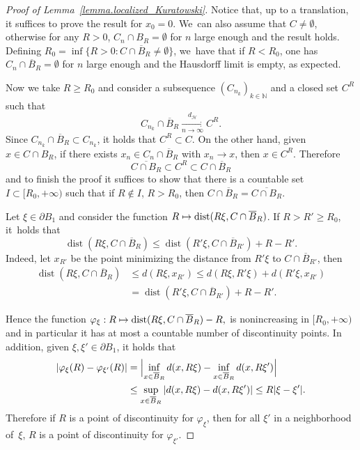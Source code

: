 \documentclass[11pt]{article}
\numberwithin{equation}{section}
\let\ts\textstyle
\newcommand\mto{\mathchoice{\longmapsto}{\mapsto}{\mapsto}{\mapsto}}
\theoremstyle{definition}
\DeclareMathOperator{\dist}{dist}
\newcommand{\distH}{d_{\mathcal{H}}}
\newcommand{\oB}{\overline{B}}
\begin{document}
\begin{proof}[Proof of Lemma~\ref{lemma.localized_Kuratowski}]
Notice that, up to a translation, it suffices to prove the result for $x_0 = 0$. We~can also assume that $C\neq\emptyset$, otherwise
for any $R>0$, $C_n\cap B_R=\emptyset$ for $n$ large enough and the result holds.
Defining $R_0=\inf\{R>0: C\cap \oB_R\neq\emptyset\}$, we~have that if $R<R_0$,
one has $C_n\cap \oB_{R}=\emptyset$ for $n$ large enough
and the Hausdorff limit is empty, as expected.

Now we take $R\ge R_0$ and consider a subsequence $\left(C_{n_k}\right)_{k \in \mathbb{N}}$ and a closed set $C^R$ such that
\[
C_{n_k}\cap \oB_R \xrightarrow[n \to \infty]{\ts\distH} C^R.
\]
Since $C_{n_k}\cap\oB_R\subset C_{n_k}$, it holds that $C^R\subset C$.
On the other hand, given $x\in C \cap B_R$, if there exists $x_n\in C_n \cap \oB_R$
with $x_n\to x$, then $x\in C^R$.
Therefore
\[
\overline{C\cap B_R}\subset C^R\subset C\cap\oB_R
\]
and to finish the proof it suffices to show that there is a countable set $I\subset [R_0,+\infty)$ such that
if $R\not\in I$, $R>R_0$, then $C\cap\oB_R =
\overline{C\cap B_R}$.

Let $\xi\in \partial B_1$ and consider the function
$R\mto \dist(R\xi,C\cap \oB_R)$. If $R>R'\ge R_0$, it~holds that
\[
\dist(R\xi,C\cap \oB_R)
\le \dist(R'\xi,C\cap \oB_{R'})+R-R'.
\]
Indeed, let $x_{R'}$ be the point minimizing the distance from $R'\xi$ to $C\cap \oB_{R'}$, then
\begin{align*}
\dist(R\xi, C\cap \oB_R)
&\le
d(R\xi, x_{R'})
\le
d(R\xi, R'\xi) + d(R'\xi, x_{R'}) \\
&=
\dist(R'\xi, C\cap \oB_{R'}) + R - R'.
\end{align*}

Hence the function
$
\varphi_\xi : R \mto \dist(R\xi,C\cap \oB_R)-R,
$
is nonincreasing in $[R_0,+\infty)$ and in particular it has at
most a countable number of discontinuity points. In addition, given $\xi,\xi'\in\partial B_1$, it holds that
\begin{align*}
\left|
\varphi_\xi(R) - \varphi_{\xi'}(R)
\right|
&=
\Bigl|
\inf_{x \in \oB_R} d(x, R\xi) - \inf_{x \in \oB_R} d(x, R\xi')
\Bigr|\\
&\le
\sup_{x \in \oB_R}
\left|
d(x, R\xi) - d(x, R\xi')
\right|
\le R|\xi - \xi'|.
\end{align*}
Therefore if $R$ is a point of discontinuity for $\varphi_\xi$, then
for all $\xi'$ in a neighborhood of~$\xi$, $R$ is a point
of discontinuity for $\varphi_{\xi'}$.


\end{proof}
\end{document}
